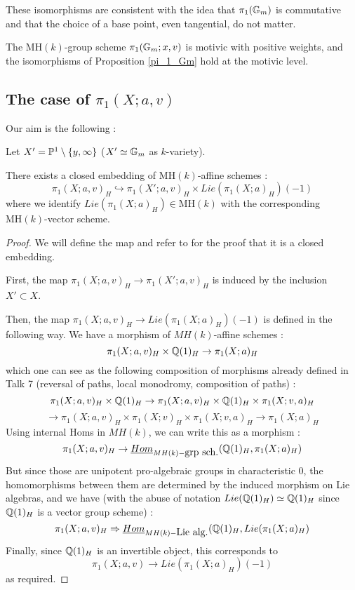 These isomorphisms are consistent with the idea that $\pi_1(\mathbb{G}_m)$ is commutative and that the choice of a base point, even tangential, do not matter. 

\begin{cor}
The $\mathrm{MH}(k)$-group scheme $\pi_1(\mathbb{G}_m;x,v)$ is motivic with positive weights, and the isomorphisms of Proposition \ref{pi_1_Gm} hold at the motivic level.
\end{cor}


\subsection{The case of $\pi_1(X;a,v)$}

Our aim is the following :

\begin{prop}
\label{pi_1_av}
Let $X'=\mathbb{P}^1\setminus \{y,\infty\}$ ($X'\simeq \mathbb{G}_m$ as $k$-variety).

There exists a closed embedding of $\mathrm{MH}(k)$-affine schemes :
\[
\pi_1(X;a,v)_H\hookrightarrow \pi_1(X';a,v)_H\times Lie(\pi_1(X;a)_H)(-1)
\]
where we identify $Lie(\pi_1(X;a)_H)\in \mathrm{MH}(k)$ with the corresponding $\mathrm{MH}(k)$-vector scheme.
\end{prop}
\begin{proof}
We will define the map and refer to \cite[4.4-4.10]{deligne-goncharov05} for the proof that it is a closed embedding.

First, the map $\pi_1(X;a,v)_H\rightarrow \pi_1(X';a,v)_H$ is induced by the inclusion $X'\subset X$.

Then, the map $\pi_1(X;a,v)_H\rightarrow Lie(\pi_1(X;a)_H)(-1)$ is defined in the following way. We have a morphism of $MH(k)$-affine schemes :
\[
\pi_1(X;a,v)_H\times \mathbb{Q}(1)_H\rightarrow \pi_1(X;a)_H
\]
which one can see as the following composition of morphisms already defined in Talk 7 (reversal of paths, local monodromy, composition of paths) :
\[
\pi_1(X;a,v)_H\times \mathbb{Q}(1)_H\rightarrow \pi_1(X;a,v)_H\times \mathbb{Q}(1)_H\times\pi_1(X;v,a)_H
\]
\[
\rightarrow \pi_1(X;a,v)_H\times \pi_1(X;v)_H\times \pi_1(X;v,a)_H\rightarrow \pi_1(X;a)_H
\]
Using internal Homs in $MH(k)$, we can write this as a morphism :
\[
\pi_1(X;a,v)_H\rightarrow \underline{Hom}_{MH(k)-\mbox{grp sch.}}(\mathbb{Q}(1)_H,\pi_1(X;a)_H)
\]
But since those are unipotent pro-algebraic groups in characteristic 0, the homomorphisms between them are determined by the induced morphism on Lie algebras, and we have (with the abuse of notation $Lie(\mathbb{Q}(1)_H)\simeq \mathbb{Q}(1)_H$ since $\mathbb{Q}(1)_H$ is a vector group scheme) :
\[
\pi_1(X;a,v)_H\Rightarrow \underline{Hom}_{MH(k)-\mbox{Lie alg.}}(\mathbb{Q}(1)_H,Lie(\pi_1(X;a)_H)
\]
Finally, since $\mathbb{Q}(1)_H$ is an invertible object, this corresponds to
\[
\pi_1(X;a,v)\longrightarrow Lie(\pi_1(X;a)_H)(-1)
\]
as required.
\end{proof}

